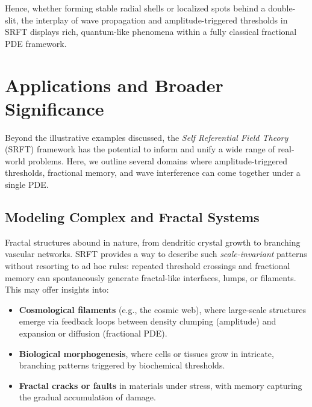 \documentclass[12pt]{article}
\begin{document}
\noindent
Hence, whether forming stable radial shells or localized spots behind a double-slit,
the interplay of wave propagation and amplitude-triggered thresholds in SRFT displays
rich, quantum-like phenomena within a fully classical fractional PDE framework.

\section{Applications and Broader Significance}
\label{sec:applications_significance}

Beyond the illustrative examples discussed, the \emph{Self Referential Field Theory }
(SRFT) framework has the potential to inform and unify a wide range of real-world
problems. Here, we outline several domains where amplitude-triggered thresholds,
fractional memory, and wave interference can come together under a single PDE.

\subsection{Modeling Complex and Fractal Systems}
\label{subsec:complex_fractal_systems}
Fractal structures abound in nature, from dendritic crystal growth to branching
vascular networks. SRFT provides a way to describe such \emph{scale-invariant}
patterns without resorting to ad hoc rules: repeated threshold crossings and
fractional memory can spontaneously generate fractal-like interfaces, lumps, or
filaments. This may offer insights into:
\begin{itemize}
    \item \textbf{Cosmological filaments} (e.g., the cosmic web), where large-scale
          structures emerge via feedback loops between density clumping (amplitude)
          and expansion or diffusion (fractional PDE).
    \item \textbf{Biological morphogenesis}, where cells or tissues grow in intricate,
          branching patterns triggered by biochemical thresholds.
    \item \textbf{Fractal cracks or faults} in materials under stress, with memory
          capturing the gradual accumulation of damage.
\end{itemize}
\end{document}
